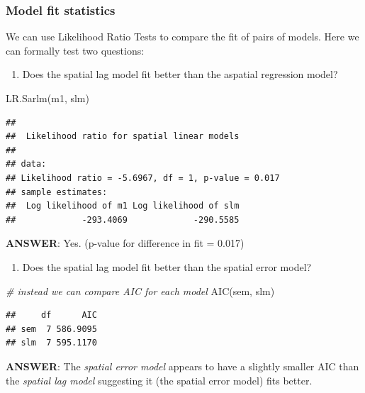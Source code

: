 \documentclass[
]{book}
\newenvironment{Shaded}{\begin{snugshade}}{\end{snugshade}}
\newcommand{\CommentTok}[1]{\textcolor[rgb]{0.56,0.35,0.01}{\textit{#1}}}
\newcommand{\FunctionTok}[1]{\textcolor[rgb]{0.00,0.00,0.00}{#1}}
\newcommand{\NormalTok}[1]{#1}
\providecommand{\tightlist}{%
  \setlength{\itemsep}{0pt}\setlength{\parskip}{0pt}}
\begin{document}
\hypertarget{model-fit-statistics}{%
\subsubsection{Model fit statistics}\label{model-fit-statistics}}

We can use Likelihood Ratio Tests to compare the fit of pairs of models. Here we can formally test two questions:

\begin{enumerate}
\def\labelenumi{\arabic{enumi}.}
\tightlist
\item
  Does the spatial lag model fit better than the aspatial regression model?
\end{enumerate}

\begin{Shaded}
\begin{Highlighting}[]
\FunctionTok{LR.Sarlm}\NormalTok{(m1, slm)}
\end{Highlighting}
\end{Shaded}

\begin{verbatim}
## 
##  Likelihood ratio for spatial linear models
## 
## data:  
## Likelihood ratio = -5.6967, df = 1, p-value = 0.017
## sample estimates:
##  Log likelihood of m1 Log likelihood of slm 
##             -293.4069             -290.5585
\end{verbatim}

\textbf{ANSWER}: Yes. (p-value for difference in fit = 0.017)

\begin{enumerate}
\def\labelenumi{\arabic{enumi}.}
\setcounter{enumi}{1}
\tightlist
\item
  Does the spatial lag model fit better than the spatial error model?
\end{enumerate}

\begin{Shaded}
\begin{Highlighting}[]
\CommentTok{\# instead we can compare AIC for each model}
\FunctionTok{AIC}\NormalTok{(sem, slm)}
\end{Highlighting}
\end{Shaded}

\begin{verbatim}
##     df      AIC
## sem  7 586.9095
## slm  7 595.1170
\end{verbatim}

\textbf{ANSWER}: The \emph{spatial error model} appears to have a slightly smaller AIC than the \emph{spatial lag model} suggesting it (the spatial error model) fits better.
\end{document}
